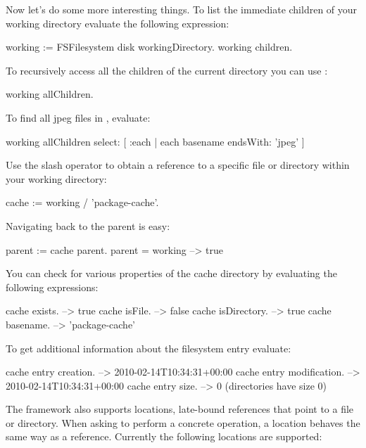 \documentclass[a4paper,10pt,twoside]{book}
\begin{document}
Now let's do some more interesting things. To list the immediate children of your working directory evaluate the following expression:

\begin{code}{}
working := FSFilesystem disk workingDirectory.
working children.
\end{code} 

To recursively access all the children of the current directory you can use :

\begin{code}{}
working allChildren.
\end{code}


To find all jpeg files in , evaluate:

\begin{code}{}
working allChildren select: [ :each | each basename endsWith: 'jpeg' ]
\end{code} 
 
Use the slash operator to obtain a reference to a specific file or directory within your working directory:

\begin{code}{}
cache := working / 'package-cache'.
\end{code} 

Navigating back to the parent is easy:

\begin{code}{}
parent := cache parent.
parent = working			--> true
\end{code}

You can check for various properties of the cache directory by evaluating the following expressions:

\begin{code}{}
 cache exists.				--> true
 cache isFile.				--> false
 cache isDirectory.			--> true
 cache basename.			--> 'package-cache'
\end{code} 
 
To get additional information about the filesystem entry evaluate:

\begin{code}{}
 cache entry creation.		--> 2010-02-14T10:34:31+00:00
 cache entry modification.	--> 2010-02-14T10:34:31+00:00
 cache entry size.			--> 0 (directories have size 0)
\end{code} 

The framework also supports locations, late-bound references that point to a file or directory. When asking to perform a concrete operation, a location behaves the same way as a reference. Currently the following locations are supported:
\end{document}
